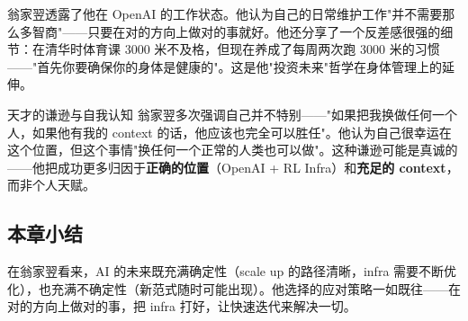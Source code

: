翁家翌透露了他在 OpenAI 的工作状态。他认为自己的日常维护工作"并不需要那么多智商"——只要在对的方向上做对的事就好。他还分享了一个反差感很强的细节：在清华时体育课 3000 米不及格，但现在养成了每周两次跑 3000 米的习惯——"首先你要确保你的身体是健康的"。这是他"投资未来"哲学在身体管理上的延伸。

\begin{warningbox}{天才的谦逊与自我认知}
翁家翌多次强调自己并不特别——"如果把我换做任何一个人，如果他有我的 context 的话，他应该也完全可以胜任"。他认为自己很幸运在这个位置，但这个事情"换任何一个正常的人类也可以做"。这种谦逊可能是真诚的——他把成功更多归因于\textbf{正确的位置}（OpenAI + RL Infra）和\textbf{充足的 context}，而非个人天赋。
\end{warningbox}

\subsection{本章小结}

在翁家翌看来，AI 的未来既充满确定性（scale up 的路径清晰，infra 需要不断优化），也充满不确定性（新范式随时可能出现）。他选择的应对策略一如既往——在对的方向上做对的事，把 infra 打好，让快速迭代来解决一切。


